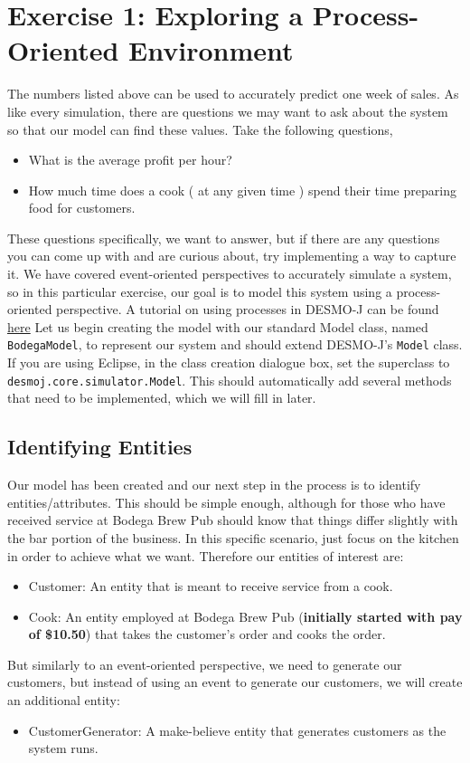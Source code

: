 \documentclass[11pt]{article}
\newcommand{\class}[1]{\texttt{#1}}
\begin{document}
\section*{Exercise 1: Exploring a Process-Oriented Environment}
The numbers listed above can be used to accurately predict one week of sales.
\newline
As like every simulation, there are questions we may want to ask about the system so that our model can find these values. Take the following questions,
\begin{itemize}[noitemsep]
	\item What is the average profit per hour?
	\item How much time does a cook ( at any given time ) spend their time preparing food for customers.
\end{itemize}
These questions specifically, we want to answer, but if there are any questions you can come up with and are curious about, try implementing a way to capture it.
We have covered event-oriented perspectives to accurately simulate a system, so in this particular exercise, our goal is to model this system using
a process-oriented perspective.
%
A tutorial on using processes in DESMO-J can be found \href{http://desmoj.sourceforge.net/tutorial/processes/0.html}{here}
Let us begin creating the model with our standard Model class, named \class{BodegaModel},
 to represent our system and should extend DESMO-J's \class{Model} class.
If you are using Eclipse, in the class creation dialogue box, set the
superclass to \class{desmoj.core.simulator.Model}. This should automatically
add several methods that need to be implemented, which we will fill in later.
\subsection*{Identifying Entities}
Our model has been created and our next step in the process is to identify entities/attributes. This should be simple enough, although for those who have
received service at Bodega Brew Pub should know that things differ slightly with the bar portion of the business. In this specific scenario, just focus on the
kitchen in order to achieve what we want. Therefore our entities of interest are:
\begin{itemize}[noitemsep]
	\item Customer: An entity that is meant to receive service from a cook.
	\item Cook: An entity employed at Bodega Brew Pub (\textbf{initially started with pay of \$10.50}) that takes the customer's order and cooks the order.
\end{itemize}
But similarly to an event-oriented perspective, we need to generate our customers, but instead of using an event to generate our customers, we will create an additional entity:
\begin{itemize}[noitemsep]
	\item CustomerGenerator: A make-believe entity that generates customers as the system runs.
\end{itemize}
\end{document}
